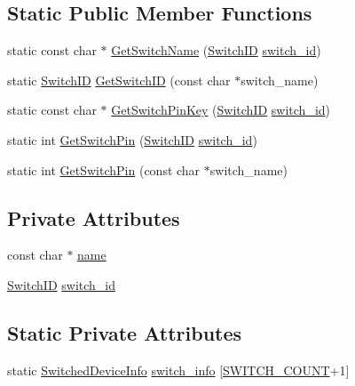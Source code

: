 \subsection*{Static Public Member Functions}
\begin{DoxyCompactItemize}
\item 
static const char $\ast$ \hyperlink{classcubesat_1_1PDUSwitch_aa326a238525f39182313fba2dbfb159e}{Get\+Switch\+Name} (\hyperlink{namespacecubesat_a4343cdc3d5f03bad7a16bac6c47cd1ca}{Switch\+ID} \hyperlink{classcubesat_1_1PDUSwitch_a4f528e19179a2a6c07437fc892ca3a73}{switch\+\_\+id})
\item 
static \hyperlink{namespacecubesat_a4343cdc3d5f03bad7a16bac6c47cd1ca}{Switch\+ID} \hyperlink{classcubesat_1_1PDUSwitch_aca06324f41be9ad19fc01dacbbd301e7}{Get\+Switch\+ID} (const char $\ast$switch\+\_\+name)
\item 
static const char $\ast$ \hyperlink{classcubesat_1_1PDUSwitch_a09632cb39b09610b088e3865517d3e4b}{Get\+Switch\+Pin\+Key} (\hyperlink{namespacecubesat_a4343cdc3d5f03bad7a16bac6c47cd1ca}{Switch\+ID} \hyperlink{classcubesat_1_1PDUSwitch_a4f528e19179a2a6c07437fc892ca3a73}{switch\+\_\+id})
\item 
static int \hyperlink{classcubesat_1_1PDUSwitch_a9f3774f4d48d228b066cf441e342661b}{Get\+Switch\+Pin} (\hyperlink{namespacecubesat_a4343cdc3d5f03bad7a16bac6c47cd1ca}{Switch\+ID} \hyperlink{classcubesat_1_1PDUSwitch_a4f528e19179a2a6c07437fc892ca3a73}{switch\+\_\+id})
\item 
static int \hyperlink{classcubesat_1_1PDUSwitch_a8ea76538610e321324eff6bcab2d9ce2}{Get\+Switch\+Pin} (const char $\ast$switch\+\_\+name)
\end{DoxyCompactItemize}
\subsection*{Private Attributes}
\begin{DoxyCompactItemize}
\item 
const char $\ast$ \hyperlink{classcubesat_1_1PDUSwitch_a2e3a4106c80a9151f795ca3ede55c64f}{name}
\item 
\hyperlink{namespacecubesat_a4343cdc3d5f03bad7a16bac6c47cd1ca}{Switch\+ID} \hyperlink{classcubesat_1_1PDUSwitch_a4f528e19179a2a6c07437fc892ca3a73}{switch\+\_\+id}
\end{DoxyCompactItemize}
\subsection*{Static Private Attributes}
\begin{DoxyCompactItemize}
\item 
static \hyperlink{structcubesat_1_1SwitchedDeviceInfo}{Switched\+Device\+Info} \hyperlink{classcubesat_1_1PDUSwitch_ae0f99c4f70fdec9ffca767441bd427db}{switch\+\_\+info} \mbox{[}\hyperlink{switch_8h_ad7db8926cbb872ec36c2e94db869235f}{S\+W\+I\+T\+C\+H\+\_\+\+C\+O\+U\+NT}+1\mbox{]}
\end{DoxyCompactItemize}
